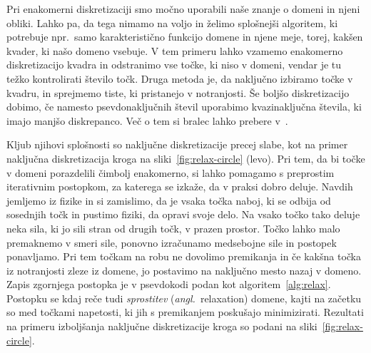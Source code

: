\documentclass[a4paper,twoside]{article}
\theoremstyle{definition} %
\theoremstyle{plain} %
\numberwithin{equation}{section}
\newcommand{\ang}[1]{(\textit{angl.}\ #1)}
\begin{document}
Pri enakomerni diskretizaciji smo močno uporabili naše znanje o domeni in njeni
obliki. Lahko pa, da tega nimamo na voljo in želimo splošnejši algoritem, ki
potrebuje npr.~samo karakteristično funkcijo domene in njene meje, torej, kakšen
kvader, ki našo domeno vsebuje.
V tem primeru lahko vzamemo enakomerno diskretizacijo kvadra in odstranimo vse
točke, ki niso v domeni, vendar je tu težko kontrolirati število točk.
Druga metoda je, da naključno izbiramo točke v kvadru, in sprejmemo tiste, ki
pristanejo v notranjosti. Še boljšo diskretizacijo dobimo, če namesto
psevdonaključnih števil uporabimo kvazinaključna števila, ki imajo manjšo
diskrepanco. Več o tem si bralec lahko prebere v~\cite{morokoff1994quasi}.

Kljub njihovi splošnosti so naključne diskretizacije precej slabe, kot na primer
naključna diskretizacija kroga na sliki~\ref{fig:relax-circle} (levo).
Pri tem, da bi točke v domeni porazdelili čimbolj enakomerno, si lahko pomagamo
s preprostim iterativnim postopkom, za katerega se izkaže, da v praksi dobro
deluje. Navdih jemljemo iz fizike in si zamislimo, da je vsaka točka naboj, ki
se odbija od sosednjih točk in pustimo fiziki, da opravi svoje delo.
Na vsako točko tako deluje neka sila, ki jo sili
stran od drugih točk, v prazen prostor. Točko lahko malo premaknemo v smeri
sile, ponovno izračunamo medsebojne sile in postopek ponavljamo. Pri tem točkam
na robu ne dovolimo premikanja in če kakšna točka iz notranjosti zleze iz
domene, jo postavimo na naključno mesto nazaj v domeno. Zapis zgornjega postopka
je v psevdokodi podan kot algoritem~\ref{alg:relax}. Postopku se kdaj reče
tudi \emph{sprostitev} \ang{relaxation} domene, kajti na začetku so med točkami
napetosti, ki jih s premikanjem poskušajo minimizirati. Rezultati na primeru
izboljšanja naključne diskretizacije kroga so podani na
sliki~\ref{fig:relax-circle}.
\end{document}
